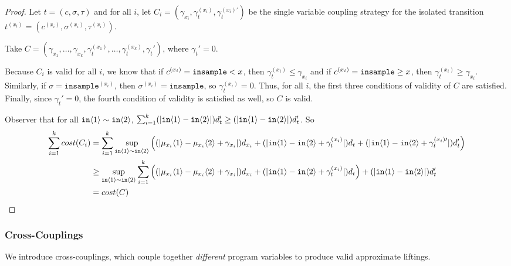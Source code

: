 \begin{proof}
    Let $t = (c, \sigma, \tau)$ and for all $i$, let $C_i = (\gamma_{x_i}, \gamma_t^{(x_i)}, \gamma_t^{(x_i)\prime})$ be the single variable coupling strategy for the isolated transition $t^{(x_i)} = (c^{(x_i)}, \sigma^{(x_i)}, \tau^{(x_i)})$. 
    
    Take $C = (\gamma_{x_1}, \ldots, \gamma_{x_k}, \gamma_t^{(x_1)}, \ldots, \gamma_t^{(x_k)}, \gamma_t')$, where $\gamma_t' = 0$.

    Because $C_i$ is valid for all $i$, we know that if $c^{(x_i)} = \texttt{insample} < x$, then $\gamma_t^{(x_i)}\leq \gamma_{x_i}$ and if $c^{(x_i)} = \texttt{insample}\geq x$, then $\gamma_t^{(x_i)}\geq \gamma_{x_i}$. Similarly, if $\sigma = \texttt{insample}^{(x_i)}$, then $\sigma^{(x_i)} = \texttt{insample}$, so $\gamma_t^{(x_i)} = 0$. Thus, for all $i$, the first three conditions of validity of $C$ are satisfied. Finally, since $\gamma_t' = 0$, the fourth condition of validity is satisfied as well, so $C$ is valid.
    
    Observer that for all $\texttt{in}\langle1 \rangle\sim\texttt{in}\langle2 \rangle$, $\sum_{i=1}^k(|\texttt{in}\langle1 \rangle-\texttt{in}\langle2 \rangle|)d_t'\geq (|\texttt{in}\langle1 \rangle-\texttt{in}\langle2 \rangle|)d_t'$. 
    So \begin{align*}
        \sum_{i=1}^k cost(C_i) &= \sum_{i=1}^k\sup_{\texttt{in}\langle1 \rangle\sim\texttt{in}\langle2 \rangle}\left((|\mu_{x_i}\langle1 \rangle-\mu_{x_i}\langle2 \rangle+\gamma_{x_i}|)d_{x_i}+(|\texttt{in}\langle1 \rangle-\texttt{in}\langle2 \rangle+\gamma_t^{(x_i)}|)d_t+(|\texttt{in}\langle1 \rangle-\texttt{in}\langle2 \rangle+\gamma_t^{(x_i)\prime}|)d_t'\right)\\
        &\geq \sup_{\texttt{in}\langle1 \rangle\sim\texttt{in}\langle2 \rangle}\sum_{i=1}^k\left((|\mu_{x_i}\langle1 \rangle-\mu_{x_i}\langle2 \rangle+\gamma_{x_i}|)d_{x_i}+(|\texttt{in}\langle1 \rangle-\texttt{in}\langle2 \rangle+\gamma_t^{(x_i)}|)d_t\right)+(|\texttt{in}\langle1 \rangle-\texttt{in}\langle2 \rangle|)d_t'\\
        & = cost(C)
    \end{align*}
\end{proof}

\subsubsection{Cross-Couplings}

We introduce cross-couplings, which couple together \textit{different} program variables to produce valid approximate liftings. 

